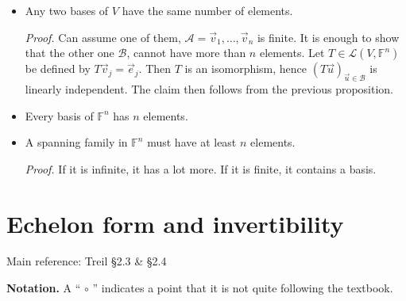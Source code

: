 \documentclass[11pt]{article}
\newcommand{\1}{\mathbf{1}}
\newcommand{\0}{\mathbf{0}}
\newcommand{\A}{\mathcal{A}}
\newcommand{\B}{\mathcal{B}}
\newcommand{\F}{\mathbb{F}}
\newcommand{\cL}{\mathcal{L}}
\newcommand{\ve}{\vec{e}}
\newcommand{\vu}{\vec{u}}
\newcommand{\vv}{\vec{v}}
\begin{document}
\begin{itemize}
\item

Any two bases of $V$ have the same number of elements.

\emph{Proof.}
Can assume one of them, $\A = \vv_1,\dots,\vv_n$ is finite.
It is enough to show that the other one $\B$, cannot have more than $n$ elements.
Let $T\in\cL(V,\F^n)$ be defined by $T\vv_j = \ve_j$.
Then $T$ is an isomorphism, hence $(T\vu)_{\vu \in \B}$ is linearly independent.
The claim then follows from the previous proposition.

\item

Every basis of $\F^n$ has $n$ elements.

\item

A spanning family in $\F^n$ must have at least $n$ elements.

\emph{Proof.}
If it is infinite, it has a lot more. If it is finite, it contains a basis.
\end{itemize}


\clearpage
\section{Echelon form and invertibility}

Main reference:
Treil \S2.3 \& \S2.4

\textbf{Notation.}
A `` $\circ$ '' indicates a point that it is not quite following the textbook.
\end{document}
